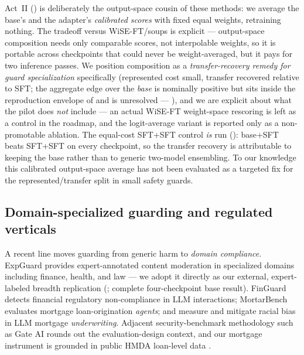 Act~II () is deliberately the output-space cousin of these methods: we average the
base's and the adapter's \emph{calibrated scores} with fixed equal weights, retraining nothing. The
tradeoff versus WiSE-FT/soups is explicit --- output-space composition needs only comparable scores,
not interpolable weights, so it is portable across checkpoints that could never be weight-averaged, but
it pays for two inference passes. We position composition as a \emph{transfer-recovery remedy for guard
specialization} specifically (represented cost small, transfer recovered relative to SFT; the aggregate
edge over the \emph{base} is nominally positive but sits inside the reproduction envelope of
 and is unresolved --- ), and we are
explicit about what the pilot does
\emph{not} include --- an actual WiSE-FT weight-space rescoring is
left as a control in the roadmap, and the logit-average variant is reported only as a non-promotable
ablation. The equal-cost SFT+SFT control \emph{is} run (): base+SFT beats SFT+SFT on every
checkpoint, so the transfer recovery is attributable to keeping the base rather than to generic two-model
ensembling. To our knowledge this calibrated output-space average has not been evaluated as a targeted fix
for the represented/transfer split in small safety guards.

\subsection{Domain-specialized guarding and regulated verticals}
\label{sec:related-domain}
A recent line moves guarding from generic harm to \emph{domain compliance}. ExpGuard
\citep{expguard2026} provides expert-annotated content moderation in specialized domains including
finance, health, and law --- we adopt it directly as our external, expert-labeled breadth replication
(; complete four-checkpoint base result). FinGuard
\citep{dou2026finguard} detects financial regulatory non-compliance in LLM interactions; MortarBench
\citep{toles2026mortarbench} evaluates mortgage loan-origination \emph{agents}; and
\citet{bowen2024mortgage} measure and mitigate racial bias in LLM mortgage \emph{underwriting}.
Adjacent security-benchmark methodology such as Gate AI \citep{goehausen2026gateai} rounds out the
evaluation-design context, and our mortgage instrument is grounded in public HMDA loan-level data
\citep{hmda2022}.

